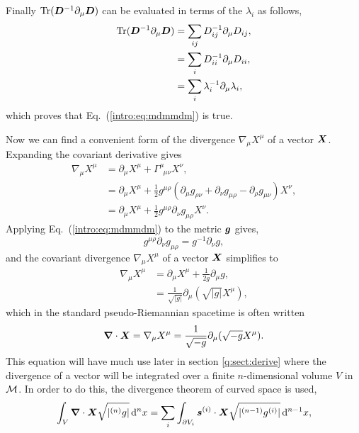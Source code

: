 Finally $\mathrm{Tr}(\boldsymbol{D}^{-1} \partial_\mu \boldsymbol{D})$ can be evaluated in terms of the $\lambda_i$ as follows,
\begin{align}
\mathrm{Tr}(\boldsymbol{D}^{-1} \partial_\mu \boldsymbol{D}) &= \sum_{ij} D^{-1}_{ij} \partial_\mu D_{ij} ,\\
&= \sum_i D^{-1}_{ii} \partial_\mu D_{ii} ,\\
&= \sum_i \lambda_i^{-1} \partial_\mu \lambda_i,
\end{align}
which proves that Eq.~(\ref{intro:eq:mdmmdm}) is true.


Now we can find a convenient form of the divergence $\nabla_\mu X^\mu$ of a vector $\boldsymbol{X}$. Expanding the covariant derivative gives
\begin{align}
\nabla_\mu X^\mu &= \partial_\mu X^\mu + \Gamma^\mu_{\,\,\,\mu\nu}X^\nu , \\
&= \partial_\mu X^\mu + \frac{1}{2}g^{\mu\rho}\left(\partial_\mu g_{\rho\nu}+\partial_\nu g_{\mu\rho}-\partial_\rho g_{\mu\nu}\right)X^\nu , \\
&= \partial_\mu X^\mu + \frac{1}{2}g^{\mu\rho}\partial_\nu g_{\mu\rho}X^\nu.
\end{align}
Applying Eq.~(\ref{intro:eq:mdmmdm}) to the metric $\boldsymbol{g}$ gives,
\begin{equation} \label{intro:eq:gdggdg}
g^{\mu\rho}\partial_\nu g_{\mu\rho} = g^{-1} \partial_\nu g,
\end{equation}
and the covariant divergence $\nabla_\mu X^\mu$ of a vector $\boldsymbol{X}$ simplifies to
\begin{align}
\nabla_\mu X^\mu &= \partial_\mu X^\mu + \frac{1}{2g}\partial_\mu g ,\\
&= \frac{1}{\sqrt{|g|}}\partial_\mu \left(\sqrt{|g|}X^\mu\right),
\end{align}
which in the standard pseudo-Riemannian spacetime is often written
\begin{equation} \label{intro:eq:div_vector}
\boldsymbol{\nabla}\cdot \boldsymbol{X} = \nabla_\mu X^\mu = \frac{1}{\sqrt{-g}}\partial_\mu (\sqrt{-g}X^\mu).
\end{equation}
This equation will have much use later in section \ref{q:sect:derive} where the divergence of a vector will be integrated over a finite $n$-dimensional volume $V$ in $\mathcal{M}$. In order to do this, the divergence theorem of curved space is used,
\begin{equation} \label{intro:eq:properdivtheorem}
\int_V \boldsymbol{\nabla} \cdot \boldsymbol{X} \sqrt{|{}^{(n)}g|} \,\dd^n x = \sum_i \int_{\partial V_i} \boldsymbol{s}^{(i)} \cdot \boldsymbol{X} \sqrt{|{}^{(n-1)}g^{(i)}|} \,\dd^{n-1} x,
\end{equation}
